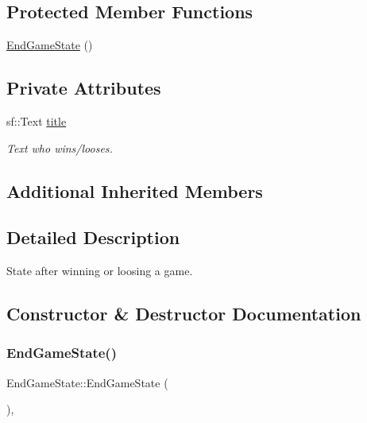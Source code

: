 \subsection*{Protected Member Functions}
\begin{DoxyCompactItemize}
\item 
\mbox{\hyperlink{class_end_game_state_ae8a250f57fa5e2498782d6e78b095d00}{End\+Game\+State}} ()
\end{DoxyCompactItemize}
\subsection*{Private Attributes}
\begin{DoxyCompactItemize}
\item 
sf\+::\+Text \mbox{\hyperlink{class_end_game_state_a987fea680922932c1ae2de74d859649d}{title}}
\begin{DoxyCompactList}\small\item\em Text who wins/looses. \end{DoxyCompactList}\end{DoxyCompactItemize}
\subsection*{Additional Inherited Members}


\subsection{Detailed Description}
State after winning or loosing a game. 

\subsection{Constructor \& Destructor Documentation}
\mbox{\label{class_end_game_state_ae8a250f57fa5e2498782d6e78b095d00}} 
\subsubsection{\texorpdfstring{EndGameState()}{EndGameState()}}
{\footnotesize\ttfamily End\+Game\+State\+::\+End\+Game\+State (\begin{DoxyParamCaption}{ }\end{DoxyParamCaption})\hspace{0.3cm}{\ttfamily [inline]}, {\ttfamily [protected]}}




